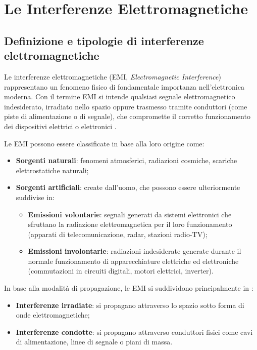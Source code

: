 \chapter{Le Interferenze Elettromagnetiche}

\section{Definizione e tipologie di interferenze elettromagnetiche}
Le interferenze elettromagnetiche (EMI, \textit{Electromagnetic Interference}) rappresentano un fenomeno fisico di fondamentale importanza nell'elettronica moderna. Con il termine EMI si intende qualsiasi segnale elettromagnetico indesiderato, irradiato nello spazio oppure trasmesso tramite conduttori (come piste di alimentazione o di segnale), che compromette il corretto funzionamento dei dispositivi elettrici o elettronici \cite{capitolo2}.

Le EMI possono essere classificate in base alla loro origine come:
\begin{itemize}
    \item \textbf{Sorgenti naturali}: fenomeni atmosferici, radiazioni cosmiche, scariche elettrostatiche naturali;
    \item \textbf{Sorgenti artificiali}: create dall'uomo, che possono essere ulteriormente suddivise in:
    \begin{itemize}
        \item \textbf{Emissioni volontarie}: segnali generati da sistemi elettronici che sfruttano la radiazione elettromagnetica per il loro funzionamento (apparati di telecomunicazione, radar, stazioni radio-TV);
        \item \textbf{Emissioni involontarie}: radiazioni indesiderate generate durante il normale funzionamento di apparecchiature elettriche ed elettroniche (commutazioni in circuiti digitali, motori elettrici, inverter).
    \end{itemize}
\end{itemize}

In base alla modalità di propagazione, le EMI si suddividono principalmente in \cite{capitolo2}:
\begin{itemize}
    \item \textbf{Interferenze irradiate}: si propagano attraverso lo spazio sotto forma di onde elettromagnetiche;
    \item \textbf{Interferenze condotte}: si propagano attraverso conduttori fisici come cavi di alimentazione, linee di segnale o piani di massa.
\end{itemize}

